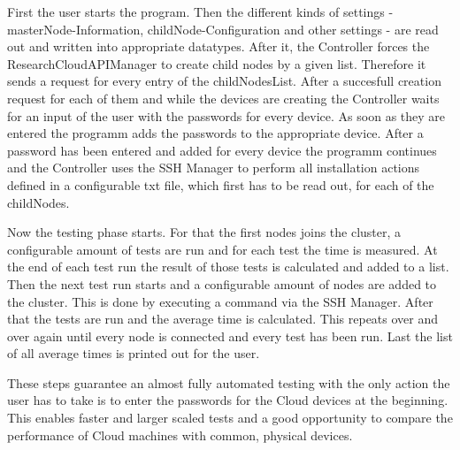 First the user starts the program. Then the different kinds of settings - masterNode-Information, childNode-Configuration and other settings - are read out and written into appropriate datatypes. After it, the Controller forces the ResearchCloudAPIManager to create child nodes by a given list. Therefore it sends a request for every entry of the childNodesList. After a succesfull creation request for each of them and while the devices are creating the Controller waits for an input of the user with the passwords for every device. As soon as they are entered the programm adds the passwords to the appropriate device. After a password has been entered and added for every device the programm continues and the Controller uses the SSH Manager to perform all installation actions defined in a configurable txt file, which first has to be read out, for each of the childNodes.

Now the testing phase starts. For that the first nodes joins the cluster, a configurable amount of tests are run and for each test the time is measured. At the end of each test run the result of those tests is calculated and added to a list. Then the next test run starts and a configurable amount of nodes are added to the cluster. This is done by executing a command via the SSH Manager. After that the tests are run and the average time is calculated. This repeats over and over again until every node is connected and every test has been run. Last the list of all average times is printed out for the user.

These steps guarantee an almost fully automated testing with the only action the user has to take is to enter the passwords for the Cloud devices at the beginning. This enables faster and larger scaled tests and a good opportunity to compare the performance of Cloud machines with common, physical devices.